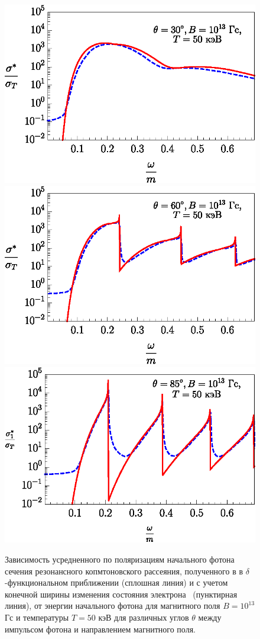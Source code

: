 \documentclass[cp1251%
               ]{jetp} %
\begin{document}
\begin{figure}[t!]\centering
\includegraphics[width=0.9\linewidth,clip]{fig2_1.eps}
\includegraphics[width=0.9\linewidth,clip]{fig2_2.eps}
\includegraphics[width=0.9\linewidth,clip]{fig2_3.eps}
\caption{Зависимость усредненного по поляризациям начального фотона сечения резонансного копмтоновского рассеяния, полученного в в $\delta$-функциональном приближении (сплошная линия) и с учетом конечной ширины изменения состояния электрона~\cite{Harding:1991} (пунктирная линия), от энергии начального фотона для магнитного поля $B = 10^{13}$ Гс и температуры $T=50$ кэВ для различных углов $\theta$ между импульсом фотона и направлением магнитного поля.}
\label{fig2}
\end{figure}
\end{document}

